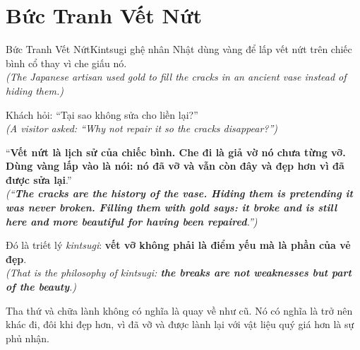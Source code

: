 \section{Bức Tranh Vết Nứt}
\begin{truyen}{Bức Tranh Vết Nứt}{Kintsugi}
ghệ nhân Nhật dùng vàng để lấp vết nứt trên chiếc bình cổ thay vì che giấu nó.\\
\textit{(The Japanese artisan used gold to fill the cracks in an ancient vase instead of hiding them.)}

Khách hỏi: ``Tại sao không sửa cho liền lại?''\\
\textit{(A visitor asked: ``Why not repair it so the cracks disappear?'')}

``\textbf{Vết nứt là lịch sử của chiếc bình. Che đi là giả vờ nó chưa từng vỡ. Dùng vàng lấp vào là nói: nó đã vỡ và vẫn còn đây và đẹp hơn vì đã được sửa lại}.''\\
\textit{(``\textbf{The cracks are the history of the vase. Hiding them is pretending it was never broken. Filling them with gold says: it broke and is still here and more beautiful for having been repaired}.'')}

Đó là triết lý \textit{kintsugi}: \textbf{vết vỡ không phải là điểm yếu mà là phần của vẻ đẹp}.\\
\textit{(That is the philosophy of \textit{kintsugi}: \textbf{the breaks are not weaknesses but part of the beauty}.)}
\end{truyen}
\begin{baihoc}
  Tha thứ và chữa lành không có nghĩa là quay về như cũ. Nó có nghĩa là trở nên khác đi, đôi khi đẹp hơn, vì đã vỡ và được lành lại với vật liệu quý giá hơn là sự phủ nhận.
\end{baihoc}

